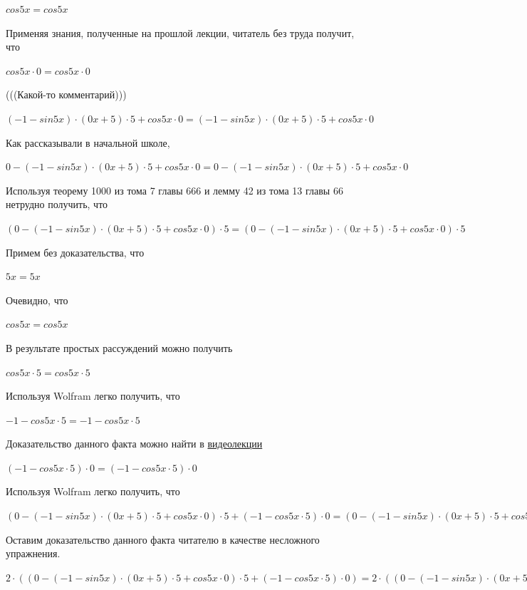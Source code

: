 \documentclass[12pt,a4paper,fleqn]{article}
\theoremstyle{definition}
\begin{document}
$cos 5  x  = cos 5  x $

Применяя знания, полученные на прошлой лекции, читатель без труда получит, что 

$cos 5  x  \cdot  0  = cos 5  x  \cdot  0 $

(((Какой-то комментарий))) 

$( -1  - sin 5  x ) \cdot ( 0  x  +  5 ) \cdot  5  + cos 5  x  \cdot  0  = ( -1  - sin 5  x ) \cdot ( 0  x  +  5 ) \cdot  5  + cos 5  x  \cdot  0 $

Как рассказывали в начальной школе, 

$ 0  - ( -1  - sin 5  x ) \cdot ( 0  x  +  5 ) \cdot  5  + cos 5  x  \cdot  0  =  0  - ( -1  - sin 5  x ) \cdot ( 0  x  +  5 ) \cdot  5  + cos 5  x  \cdot  0 $

Используя теорему 1000 из тома 7 главы 666 и лемму 42 из тома 13 главы 66 нетрудно получить, что 

$( 0  - ( -1  - sin 5  x ) \cdot ( 0  x  +  5 ) \cdot  5  + cos 5  x  \cdot  0 ) \cdot  5  = ( 0  - ( -1  - sin 5  x ) \cdot ( 0  x  +  5 ) \cdot  5  + cos 5  x  \cdot  0 ) \cdot  5 $

Примем без доказательства, что 

$ 5  x  =  5  x $

Очевидно, что 

$cos 5  x  = cos 5  x $

В результате простых рассуждений можно получить 

$cos 5  x  \cdot  5  = cos 5  x  \cdot  5 $

Используя Wolfram легко получить, что 

$ -1  - cos 5  x  \cdot  5  =  -1  - cos 5  x  \cdot  5 $

Доказательство данного факта можно найти в \href{https://www.youtube.com/watch?v=dQw4w9WgXcQ}{видеолекции} 

$( -1  - cos 5  x  \cdot  5 ) \cdot  0  = ( -1  - cos 5  x  \cdot  5 ) \cdot  0 $

Используя Wolfram легко получить, что 

$( 0  - ( -1  - sin 5  x ) \cdot ( 0  x  +  5 ) \cdot  5  + cos 5  x  \cdot  0 ) \cdot  5  + ( -1  - cos 5  x  \cdot  5 ) \cdot  0  = ( 0  - ( -1  - sin 5  x ) \cdot ( 0  x  +  5 ) \cdot  5  + cos 5  x  \cdot  0 ) \cdot  5  + ( -1  - cos 5  x  \cdot  5 ) \cdot  0 $

Оставим доказательство данного факта читателю в качестве несложного упражнения. 

$ 2  \cdot (( 0  - ( -1  - sin 5  x ) \cdot ( 0  x  +  5 ) \cdot  5  + cos 5  x  \cdot  0 ) \cdot  5  + ( -1  - cos 5  x  \cdot  5 ) \cdot  0 ) =  2  \cdot (( 0  - ( -1  - sin 5  x ) \cdot ( 0  x  +  5 ) \cdot  5  + cos 5  x  \cdot  0 ) \cdot  5  + ( -1  - cos 5  x  \cdot  5 ) \cdot  0 )$
\end{document}
